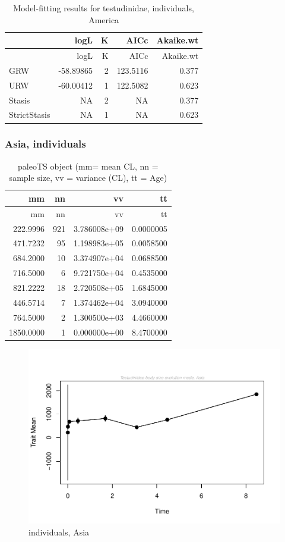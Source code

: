 \documentclass[]{article}
\begin{document}
\begin{longtable}[]{@{}lrrrr@{}}
\caption{Model-fitting results for testudinidae, individuals,
America}\tabularnewline
\toprule
& logL & K & AICc & Akaike.wt\tabularnewline
\midrule
\endfirsthead
\toprule
& logL & K & AICc & Akaike.wt\tabularnewline
\midrule
\endhead
GRW & -58.89865 & 2 & 123.5116 & 0.377\tabularnewline
URW & -60.00412 & 1 & 122.5082 & 0.623\tabularnewline
Stasis & NA & 2 & NA & 0.377\tabularnewline
StrictStasis & NA & 1 & NA & 0.623\tabularnewline
\bottomrule
\end{longtable}

\newpage

\subsubsection{Asia, individuals}\label{asia-individuals}

\begin{longtable}[]{@{}rrrr@{}}
\caption{paleoTS object (mm= mean CL, nn = sample size, vv = variance
(CL), tt = Age)}\tabularnewline
\toprule
mm & nn & vv & tt\tabularnewline
\midrule
\endfirsthead
\toprule
mm & nn & vv & tt\tabularnewline
\midrule
\endhead
222.9996 & 921 & 3.786008e+09 & 0.0000005\tabularnewline
471.7232 & 95 & 1.198983e+05 & 0.0058500\tabularnewline
684.2000 & 10 & 3.374907e+04 & 0.0688500\tabularnewline
716.5000 & 6 & 9.721750e+04 & 0.4535000\tabularnewline
821.2222 & 18 & 2.720508e+05 & 1.6845000\tabularnewline
446.5714 & 7 & 1.374462e+04 & 3.0940000\tabularnewline
764.5000 & 2 & 1.300500e+03 & 4.4660000\tabularnewline
1850.0000 & 1 & 0.000000e+00 & 8.4700000\tabularnewline
\bottomrule
\end{longtable}

\begin{figure}[htbp]
\centering
\includegraphics{MA_JJ_files/figure-latex/paleoTS, individuals, Asia-1.pdf}
\caption{individuals, Asia}
\end{figure}
\end{document}
